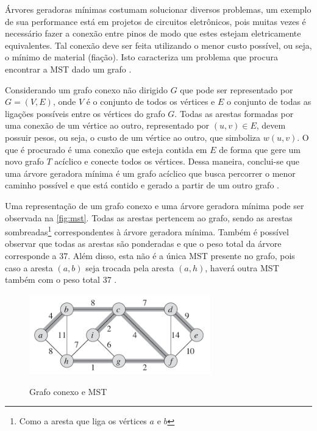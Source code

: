 \par Árvores geradoras mínimas costumam solucionar diversos problemas, um exemplo de sua performance está em projetos de circuitos eletrônicos, pois muitas vezes é necessário fazer a conexão entre pinos de modo que estes estejam eletricamente equivalentes. Tal conexão deve ser feita utilizando o menor custo possível, ou seja, o mínimo de material (fiação). Isto caracteriza um problema que procura encontrar a MST dado um grafo \cite{algoritmos}.

\par Considerando um grafo conexo não dirigido $G$ que pode ser representado por $G = (V, E)$, onde $V$ é o conjunto de todos os vértices e $E$ o conjunto de todas as ligações possíveis entre os vértices do grafo $G$. Todas as arestas formadas por uma conexão de um vértice ao outro, representado por $(u, v) \in E$, devem possuir pesos, ou seja, o custo de um vértice ao outro, que simboliza $w(u, v)$. O que é procurado é uma conexão que esteja contida em $E$ de forma que gere um novo grafo $T$ acíclico e conecte todos os vértices. Dessa maneira, conclui-se que uma árvore geradora mínima é um grafo acíclico que busca percorrer o menor caminho possível e que está contido e gerado a partir de um outro grafo \cite{algoritmos}.

\par Uma representação de um grafo conexo e uma árvore geradora mínima pode ser observada na \autoref{fig:mst}. Todas as arestas pertencem ao grafo, sendo as arestas sombreadas\footnote{Como a aresta que liga os vértices $a$ e $b$} correspondentes à árvore geradora mínima. Também é possível observar que todas as arestas são ponderadas e que o peso total da árvore corresponde a 37. Além disso, esta não é a única MST presente no grafo, pois caso a aresta $(a, b)$ seja trocada pela aresta $(a, h)$, haverá outra MST também com o peso total 37 \cite{algoritmos}.

\begin{figure}[!h]
    \centering
    \caption{Grafo conexo e MST}
    \includegraphics[width=0.7\textwidth]{./dados/figuras/grafo-mst.png}
    \label{fig:mst}
\end{figure}

